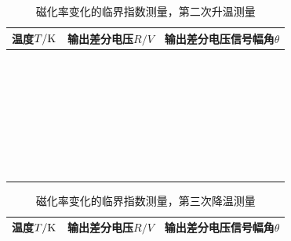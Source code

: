 \documentclass[11pt,a4paper]{ctexart}
\begin{document}
\begin{enumerate}
     \begin{table}[H]
\centering
\caption{磁化率变化的临界指数测量，第二次升温测量\label{tabley4}}
\begin{tabular}{|p{32mm}|p{32mm}|p{32mm}|}
\hline
温度$T/{\rm K}$ & 输出差分电压$R/{V}$ & 输出差分电压信号幅角$\theta$ \\ \hline
 & & \\ \hline
  & & \\ \hline
  & & \\ \hline
   & & \\ \hline
    & & \\ \hline
 & & \\ \hline
  &  &\\ \hline
  &  &\\ \hline
  &  &\\ \hline
  &  &\\ \hline
  &  &\\ \hline
  &  &\\ \hline
  &  &\\ \hline
  &  &\\ \hline
  &  &\\ \hline
  &  &\\ \hline
  &  &\\ \hline
  &  &\\ \hline
    & &\\ \hline
  & &\\ \hline
   & &\\ \hline
     &  &\\ \hline
  &  &\\ \hline
  &  &\\ \hline
  &  &\\ \hline
  &  &\\ \hline
  &  &\\ \hline
  &  &\\ \hline
  &  &\\ \hline
    & &\\ \hline
  & &\\ \hline
   & &\\ \hline
  \end{tabular}
  \end{table}
      \begin{table}[H]
\centering
\caption{磁化率变化的临界指数测量，第三次降温测量\label{tabley5}}
\begin{tabular}{|p{32mm}|p{32mm}|p{32mm}|}
\hline
温度$T/{\rm K}$ & 输出差分电压$R/{V}$ & 输出差分电压信号幅角$\theta$ \\ \hline

\end{tabular}
\end{table}
\end{enumerate}
\end{document}
